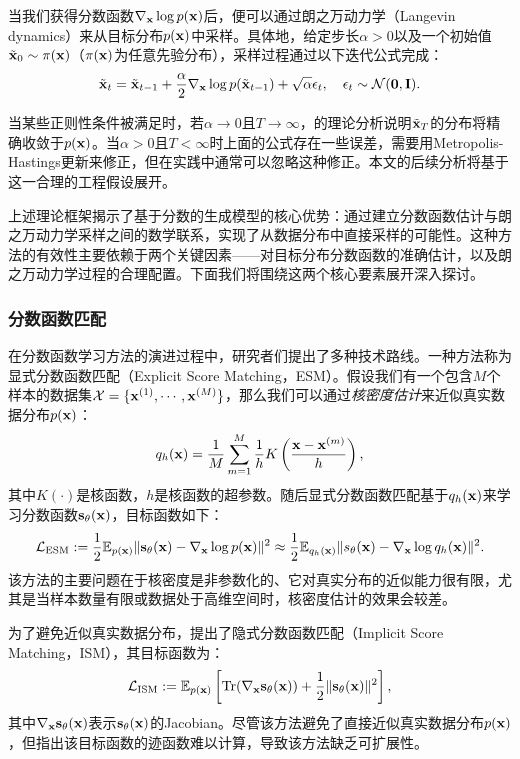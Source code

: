 \documentclass[11pt,a4paper,UTF8]{ctexart}
\begin{document}
当我们获得分数函数$\nabla_{\mathbf{x}}\log p(\mathbf{x})$后，便可以通过朗之万动力学（Langevin dynamics）来从目标分布$p(\mathbf{x})$中采样。具体地，给定步长$\alpha>0$以及一个初始值$\tilde{\mathbf{x}}_0\sim\pi(\mathbf{x})$（$\pi(\mathbf{x})$为任意先验分布），采样过程通过以下迭代公式完成：
\begin{equation*}
    \tilde{\mathbf{x}}_t = \tilde{\mathbf{x}}_{t-1} + \frac{\alpha}{2} \nabla_{\mathbf{x}}\log p(\tilde{\mathbf{x}}_{t-1}) + \sqrt{\alpha}\epsilon_t,\quad \epsilon_t\sim\mathcal{N}(\mathbf{0},\mathbf{I}).
\end{equation*}

当某些正则性条件被满足时，若$\alpha\rightarrow 0$且$T\rightarrow \infty$，\cite{max2011bayesian}的理论分析说明$\tilde{\mathbf{x}}_T$的分布将精确收敛于$p(\mathbf{x})$。当$\alpha> 0$且$T< \infty$时上面的公式存在一些误差，需要用Metropolis-Hastings更新来修正，但在实践中通常可以忽略这种修正\cite{du2019implicit,nijkamp2019anatomy}。本文的后续分析将基于这一合理的工程假设展开。

上述理论框架揭示了基于分数的生成模型的核心优势：通过建立分数函数估计与朗之万动力学采样之间的数学联系，实现了从数据分布中直接采样的可能性。这种方法的有效性主要依赖于两个关键因素——对目标分布分数函数的准确估计，以及朗之万动力学过程的合理配置。下面我们将围绕这两个核心要素展开深入探讨。

\subsubsection{分数函数匹配}

在分数函数学习方法的演进过程中，研究者们提出了多种技术路线。一种方法称为显式分数函数匹配（Explicit Score Matching，ESM）\cite{vincent2011connection}。假设我们有一个包含$M$个样本的数据集$\mathcal{X}=\{\mathbf{x}^{(1)},\cdots,\mathbf{x}^{(M)}\}$，那么我们可以通过\emph{核密度估计}来近似真实数据分布$p(\mathbf{x})$：
\begin{equation*}
    q_h(\mathbf{x})=\frac{1}{M}\sum_{m=1}^M \frac{1}{h} K\left(\frac{\mathbf{x}-\mathbf{x}^{(m)}}{h} \right),
\end{equation*}
其中$K(\cdot)$是核函数，$h$是核函数的超参数。随后显式分数函数匹配基于$q_h(\mathbf{x})$来学习分数函数$\mathbf{s}_\theta(\mathbf{x})$，目标函数如下：
\begin{equation*}
    \mathcal{L}_{\text{ESM}}:=\frac{1}{2}\mathbb{E}_{p(\mathbf{x})} \|\mathbf{s}_\theta(\mathbf{x})-\nabla_{\mathbf{x}}\log p(\mathbf{x}) \|^2 \approx \frac{1}{2}\mathbb{E}_{q_h(\mathbf{x})} \| s_\theta(\mathbf{x})-\nabla_{\mathbf{x}}\log q_h(\mathbf{x})\|^2.
\end{equation*}
该方法的主要问题在于核密度是非参数化的、它对真实分布的近似能力很有限，尤其是当样本数量有限或数据处于高维空间时，核密度估计的效果会较差。

为了避免近似真实数据分布，\cite{Hyvrinen2005EstimationON}提出了隐式分数函数匹配（Implicit Score Matching，ISM），其目标函数为：
\begin{equation*}
    \mathcal{L}_{\text{ISM}}:=\mathbb{E}_{p(\mathbf{x})} \left[\text{Tr}(\nabla_{\mathbf{x}} \mathbf{s}_\theta (\mathbf{x})) + \frac{1}{2}\|\mathbf{s}_\theta (\mathbf{x}) \|^2 \right],
\end{equation*}
其中$\nabla_{\mathbf{x}} \mathbf{s}_\theta (\mathbf{x})$表示$\mathbf{s}_\theta (\mathbf{x})$的Jacobian。尽管该方法避免了直接近似真实数据分布$p(\mathbf{x})$，但\cite{song2019generative}指出该目标函数的迹函数难以计算，导致该方法缺乏可扩展性。
\end{document}
